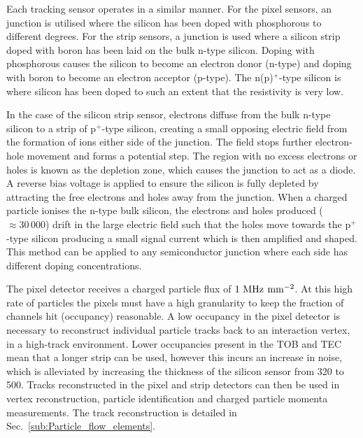 Each tracking sensor operates in a similar manner.
For the pixel sensors, an \nnjunc{} junction is utilised where the silicon has been doped with phosphorous to different degrees. 
For the strip sensors, a \pnjunc{} junction is used where a silicon strip doped with boron has been laid on the bulk n-type silicon.
Doping with phosphorous causes the silicon to become an electron donor (n-type) and doping with boron to become an electron acceptor (p-type).
The n(p)$^{+}$-type silicon is where silicon has been doped to such an extent that the resistivity is very low.%

In the case of the silicon strip sensor, electrons diffuse from the bulk n-type silicon to a strip of p$^{+}$-type silicon, creating a small opposing electric field from the formation of ions either side of the \pnjunc{} junction.
The field stops further electron-hole movement and forms a potential step.
The region with no excess electrons or holes is known as the depletion zone, which causes the junction to act as a diode.
A reverse bias voltage is applied to ensure the silicon is fully depleted by attracting the free electrons and holes away from the \pnjunc{} junction.
When a charged particle ionises the n-type bulk silicon, the electrons and holes produced ($\approx 30\,000$) drift in the large electric field such that the holes move towards the p$^{+}$-type silicon producing a small signal current which is then amplified and shaped.
This method can be applied to any semiconductor junction where each side has different doping concentrations.

The pixel detector receives a charged particle flux of $1\mathrm{~MHz}^{}\mathrm{~mm}^{-2}$. 
At this high rate of particles the pixels must have a high granularity to keep the fraction of channels hit (occupancy) reasonable.
A low occupancy in the pixel detector is necessary to reconstruct individual particle tracks back to an interaction vertex, in a high-track environment.
Lower occupancies present in the TOB and TEC mean that a longer strip can be used, however this incurs an increase in noise, which is alleviated by increasing the thickness of the silicon sensor from 320\um{} to 500\um{}.
Tracks reconstructed in the pixel and strip detectors can then be used in vertex reconstruction, particle identification and charged particle momenta measurements.
The track reconstruction is detailed in Sec.~\ref{sub:Particle_flow_elements}.

